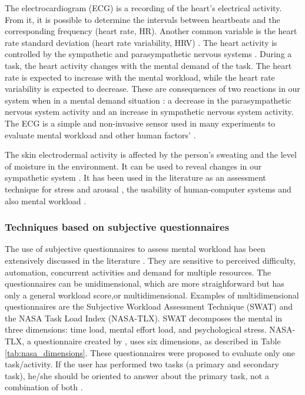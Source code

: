         The electrocardiogram (ECG) is a recording of the heart's electrical activity. From it, it is possible to determine the intervals between heartbeats and the corresponding frequency (heart rate, HR). Another common variable is the heart rate standard deviation (heart rate variability, HRV) \cite{cain2007review}. The heart activity is controlled by the sympathetic and parasympathetic nervous systems \cite{stanton2004handbook}. During a task, the heart activity changes with the mental demand of the task. The heart rate is expected to increase with the mental workload, while the heart rate variability is expected to decrease. These are consequences of two reactions in our system when in a mental demand situation \cite{stanton2004handbook}: a decrease in the parasympathetic nervous system activity and an increase in sympathetic nervous system activity. The ECG is a simple and non-invasive sensor used in many experiments to evaluate mental workload and other human factors' \cite{mohanavelu2020cognitive, mansikka2016fighter, zhang2014detection}.
                
         The skin electrodermal activity is affected by the person's sweating and the level of moisture in the environment. It can be used to reveal changes in our sympathetic system \cite{nourbakhsh2012using, shi2007galvanic}. It has been used in the literature as an assessment technique for stress and arousal \cite{nourbakhsh2012using, stanton2004handbook, shi2007galvanic}, the usability of human-computer systems \cite{shi2007galvanic} and also mental workload \cite{zhang2014detection, borghini2014measuring}.
    
    \subsubsection*{Techniques based on subjective questionnaires}

        The use of subjective questionnaires to assess mental workload has been extensively discussed in the literature \cite{sanders1998human, stanton2004handbook}. They are sensitive to perceived difficulty, automation, concurrent activities and demand for multiple resources. The questionnaires can be unidimensional, which are more straighforward but has only a general workload score,or multidimensional. Examples of multidimensional questionnaires are the Subjective Workload Assessment Technique (SWAT) and the NASA Task Load Index (NASA-TLX). SWAT decomposes the mental in three dimensions: time load, mental effort load, and psychological stress. NASA-TLX, a questionnaire created by , uses six dimensions, as described in Table \ref{tab:nasa_dimensions}. These questionnaires were proposed to evaluate only one task/activity. If the user has performed two tasks (a primary and secondary task), he/she should be oriented to answer about the primary task, not a combination of both \cite{sanders1998human}.
        
